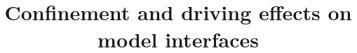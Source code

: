 \documentclass[11pt]{book}
\begin{document}


\title{Confinement and driving effects on model interfaces}                                        
\maketitle

\frontmatter

\setcounter{tocdepth}{4}
\setcounter{secnumdepth}{4}

\tableofcontents
 




\mainmatter






%
%


%



\end{document}
